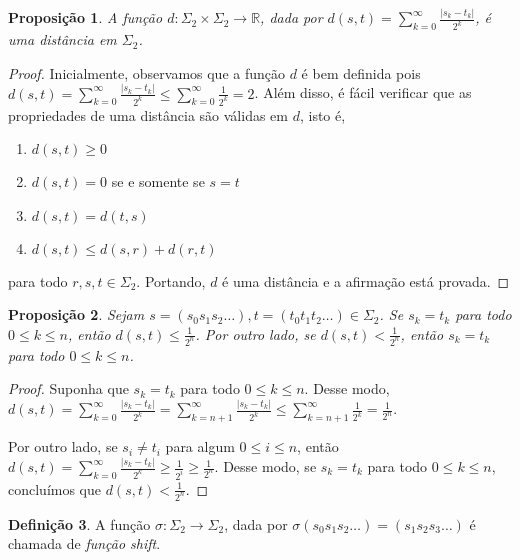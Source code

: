 \documentclass[a4paper, 12pt]{article}
\theoremstyle{definition}
\newtheorem{definition}{Definição}[section]
\theoremstyle{plain}
\newtheorem{proposition}[definition]{Proposição}
\theoremstyle{plain}
\theoremstyle{plain}
\theoremstyle{definition}
\theoremstyle{remark}
\newcommand{\RR}{\mathbb{R}}
\begin{document}
\begin{proposition}
A função $d: \Sigma_2 \times \Sigma_2 \to \RR$, dada por $d(s, t) = \sum_{k=0}^{\infty} \frac{|s_k - t_k|}{2^k}$, é uma distância em $\Sigma_2$.
\end{proposition}

\begin{proof}
Inicialmente, observamos que a função $d$ é bem definida pois $d(s, t) = \sum_{k=0}^{\infty} \frac{|s_k - t_k|}{2^k} \leq \sum_{k=0}^{\infty} \frac{1}{2^k} = 2$. Além disso, é fácil verificar que as propriedades de uma distância são válidas em $d$, isto é,
\begin{enumerate}[label=(\alph*)]
\item $d(s, t) \geq 0$
\item $d(s, t) = 0$ se e somente se $s = t$
\item  $d(s, t) = d(t, s)$
\item $d(s, t) \leq d(s, r) + d(r, t)$
\end{enumerate}
para todo $r, s, t \in \Sigma_2$. Portando, $d$ é uma distância e a afirmação está provada.
\end{proof}

\begin{proposition}
\label{proposition 6 1}
Sejam $s = (s_0s_1s_2\dots) , t = (t_0t_1t_2\dots) \in \Sigma_2$. Se $s_k = t_ k$ para todo $0 \leq k \leq n$, então $d(s, t) \leq \frac{1}{2^n}$. Por outro lado, se $d(s, t) < \frac{1}{2^n}$, então $s_k = t_k$ para todo $0 \leq k \leq n$.
\end{proposition}

\begin{proof}
Suponha que $s_k = t_ k$ para todo $0 \leq k \leq n$. Desse modo, $d(s, t) = \sum_{k=0}^{\infty} \frac{|s_k - t_k|}{2^k} = \sum_{k=n+1}^{\infty} \frac{|s_k - t_k|}{2^k} \leq \sum_{k=n+1}^{\infty} \frac{1}{2^k} = \frac{1}{2^n}$.

Por outro lado, se $s_i \neq t_i$ para algum $0 \leq i \leq n$, então $d(s, t) = \sum_{k=0}^{\infty} \frac{|s_k - t_k|}{2^k} \geq \frac{1}{2^i} \geq \frac{1}{2^n}$. Desse modo, se $s_k = t_k$ para todo $0 \leq k \leq n$, concluímos que $d(s, t) < \frac{1}{2^n}$.
\end{proof}

\begin{definition}
A função $\sigma: \Sigma_2 \to \Sigma_2$, dada por $\sigma(s_0s_1s_2\dots) = (s_1s_2s_3\dots)$ é chamada de \textit{função shift}.
\end{definition}
\end{document}
